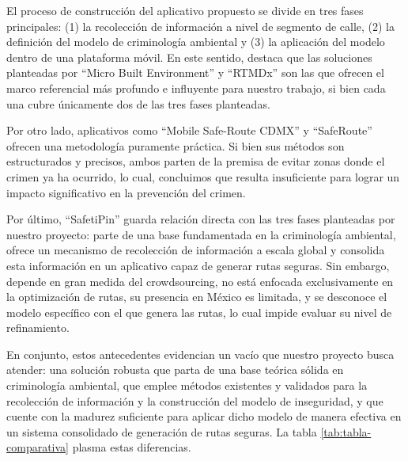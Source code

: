 
El proceso de construcción del aplicativo propuesto se divide en tres fases principales: (1) la recolección de información a nivel de segmento de calle, (2) la definición del modelo de criminología ambiental y (3) la aplicación del modelo dentro de una plataforma móvil. En este sentido, destaca que las soluciones planteadas por \enquote{Micro Built Environment} y \enquote{RTMDx} son las que ofrecen el marco referencial más profundo e influyente para nuestro trabajo, si bien cada una cubre únicamente dos de las tres fases planteadas.
 
Por otro lado, aplicativos como \enquote{Mobile Safe-Route CDMX} y \enquote{SafeRoute} ofrecen una metodología puramente práctica. Si bien sus métodos son estructurados y precisos, ambos parten de la premisa de evitar zonas donde el crimen ya ha ocurrido, lo cual, concluimos que resulta insuficiente para lograr un impacto significativo en la prevención del crimen.
 
Por último, \enquote{SafetiPin} guarda relación directa con las tres fases planteadas por nuestro proyecto: parte de una base fundamentada en la criminología ambiental, ofrece un mecanismo de recolección de información a escala global y consolida esta información en un aplicativo capaz de generar rutas seguras. Sin embargo, depende en gran medida del crowdsourcing, no está enfocada exclusivamente en la optimización de rutas, su presencia en México es limitada, y se desconoce el modelo específico con el que genera las rutas, lo cual impide evaluar su nivel de refinamiento.
 
En conjunto, estos antecedentes evidencian un vacío que nuestro proyecto busca atender: una solución robusta que parta de una base teórica sólida en criminología ambiental, que emplee métodos existentes y validados para la recolección de información y la construcción del modelo de inseguridad, y que cuente con la madurez suficiente para aplicar dicho modelo de manera efectiva en un sistema consolidado de generación de rutas seguras. La tabla \ref{tab:tabla-comparativa} plasma estas diferencias.


